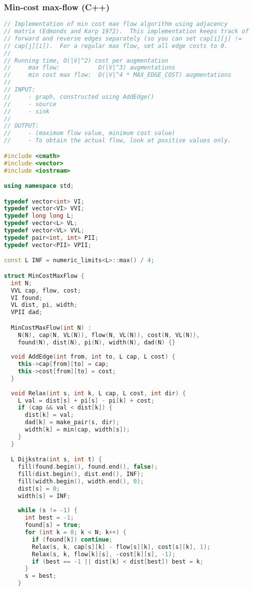 \subsubsection{Min-cost max-flow (C++)}
\begin{lstlisting}[language=C++]
// Implementation of min cost max flow algorithm using adjacency
// matrix (Edmonds and Karp 1972).  This implementation keeps track of
// forward and reverse edges separately (so you can set cap[i][j] !=
// cap[j][i]).  For a regular max flow, set all edge costs to 0.
//
// Running time, O(|V|^2) cost per augmentation
//     max flow:           O(|V|^3) augmentations
//     min cost max flow:  O(|V|^4 * MAX_EDGE_COST) augmentations
//     
// INPUT: 
//     - graph, constructed using AddEdge()
//     - source
//     - sink
//
// OUTPUT:
//     - (maximum flow value, minimum cost value)
//     - To obtain the actual flow, look at positive values only.

#include <cmath>
#include <vector>
#include <iostream>

using namespace std;

typedef vector<int> VI;
typedef vector<VI> VVI;
typedef long long L;
typedef vector<L> VL;
typedef vector<VL> VVL;
typedef pair<int, int> PII;
typedef vector<PII> VPII;

const L INF = numeric_limits<L>::max() / 4;

struct MinCostMaxFlow {
  int N;
  VVL cap, flow, cost;
  VI found;
  VL dist, pi, width;
  VPII dad;

  MinCostMaxFlow(int N) : 
    N(N), cap(N, VL(N)), flow(N, VL(N)), cost(N, VL(N)), 
    found(N), dist(N), pi(N), width(N), dad(N) {}
  
  void AddEdge(int from, int to, L cap, L cost) {
    this->cap[from][to] = cap;
    this->cost[from][to] = cost;
  }
  
  void Relax(int s, int k, L cap, L cost, int dir) {
    L val = dist[s] + pi[s] - pi[k] + cost;
    if (cap && val < dist[k]) {
      dist[k] = val;
      dad[k] = make_pair(s, dir);
      width[k] = min(cap, width[s]);
    }
  }

  L Dijkstra(int s, int t) {
    fill(found.begin(), found.end(), false);
    fill(dist.begin(), dist.end(), INF);
    fill(width.begin(), width.end(), 0);
    dist[s] = 0;
    width[s] = INF;
    
    while (s != -1) {
      int best = -1;
      found[s] = true;
      for (int k = 0; k < N; k++) {
        if (found[k]) continue;
        Relax(s, k, cap[s][k] - flow[s][k], cost[s][k], 1);
        Relax(s, k, flow[k][s], -cost[k][s], -1);
        if (best == -1 || dist[k] < dist[best]) best = k;
      }
      s = best;
    }


\end{lstlisting}
